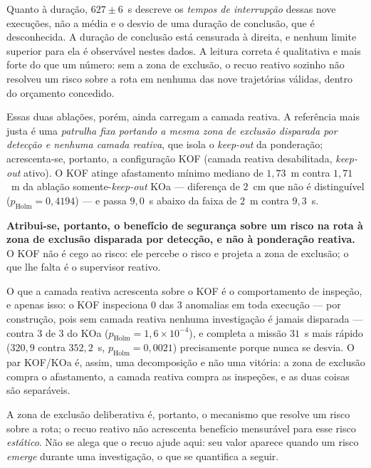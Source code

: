 Quanto à duração, $627\pm6$~s descreve os \emph{tempos de interrupção} dessas nove
execuções, não a média e o desvio de uma duração de conclusão, que é desconhecida. A
duração de conclusão está censurada à direita, e nenhum limite superior para ela é
observável nestes dados. A leitura correta é qualitativa e mais forte do que um número:
sem a zona de exclusão, o recuo reativo sozinho não resolveu um risco sobre a rota em
nenhuma das nove trajetórias válidas, dentro do orçamento concedido.

Essas duas ablações, porém, ainda carregam a camada reativa. A referência mais justa
é uma \emph{patrulha fixa portando a mesma zona de exclusão disparada por detecção e
nenhuma camada reativa}, que isola o \textit{keep-out} da ponderação; acrescenta-se,
portanto, a configuração KOF (camada reativa desabilitada, \textit{keep-out} ativo).
O KOF atinge afastamento mínimo mediano de $1{,}73$~m contra $1{,}71$~m da ablação
somente-\textit{keep-out} KOa --- diferença de $2$~cm que não é distinguível
($p_{\mathrm{Holm}}=0{,}4194$) --- e passa $9{,}0$~s abaixo da faixa de $2$~m contra
$9{,}3$~s.

\textbf{Atribui-se, portanto, o benefício de segurança sobre um risco na rota à zona
de exclusão disparada por detecção, e não à ponderação reativa.} O KOF não é cego ao
risco: ele percebe o risco e projeta a zona de exclusão; o que lhe falta é o
supervisor reativo.

O que a camada reativa acrescenta sobre o KOF é o comportamento de inspeção, e apenas
isso: o KOF inspeciona $0$ das $3$ anomalias em toda execução --- por construção,
pois sem camada reativa nenhuma investigação é jamais disparada --- contra $3$ de $3$
do KOa ($p_{\mathrm{Holm}}=1{,}6\times10^{-4}$), e completa a missão $31$~s mais
rápido ($320{,}9$ contra $352{,}2$~s, $p_{\mathrm{Holm}}=0{,}0021$) precisamente
porque nunca se desvia. O par KOF/KOa é, assim, uma decomposição e não uma vitória: a
zona de exclusão compra o afastamento, a camada reativa compra as inspeções, e as
duas coisas são separáveis.

A zona de exclusão deliberativa é, portanto, o mecanismo que resolve um risco sobre a
rota; o recuo reativo não acrescenta benefício mensurável para esse risco
\emph{estático}. Não se alega que o recuo ajude aqui: seu valor aparece quando um
risco \emph{emerge} durante uma investigação, o que se quantifica a seguir.

